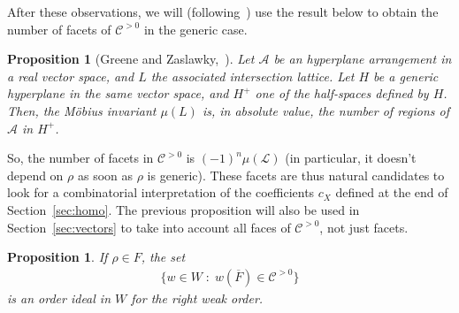 \documentclass[11pt]{article}
\newtheorem{coro}[theo]{Corollary}
\newtheorem{prop}[theo]{Proposition}
\theoremstyle{definition}
\newcommand{\LL}{\mathcal{L}}
\newcommand{\CCP}{\mathcal{C}^{>0}}
\begin{document}
After these observations, we will (following~\cite{bastidashohlwegsaliola}) use the result below to obtain the number of facets of $\CCP$ in the generic case.

\begin{prop}[Greene and Zaslawky,~\cite{greenezaslavsky}] \label{prop:greenezaslawsky}
    Let $\mathcal{A}$ be an hyperplane arrangement in a real vector space, and $L$ the associated intersection lattice.  Let $H$ be a generic hyperplane in the same vector space, and $H^+$ one of the half-spaces defined by $H$.  Then, the Möbius invariant $\mu(L)$ is, in absolute value, the number of regions of $\mathcal{A}$ in $H^+$.
\end{prop}

So, the number of facets in $\CCP$ is $(-1)^n \mu(\LL)$ (in particular, it doesn't depend on $\rho$ as soon as $\rho$ is generic).  These facets are thus natural candidates to look for a combinatorial interpretation of the coefficients $c_X$ defined at the end of Section~\ref{sec:homo}.  The previous proposition will also be used in Section~\ref{sec:vectors} to take into account all faces of $\CCP$, not just facets.




\begin{prop} \label{prop:orderideal}
    If $\rho\in F$, the set
    \begin{align} \label{eq:setWCCP}
        \big\{ w \in W \;:\; w(\overline{F}) \in \CCP \big\}
    \end{align}
    is an order ideal in $W$ for the right weak order.
\end{prop}
\end{document}
